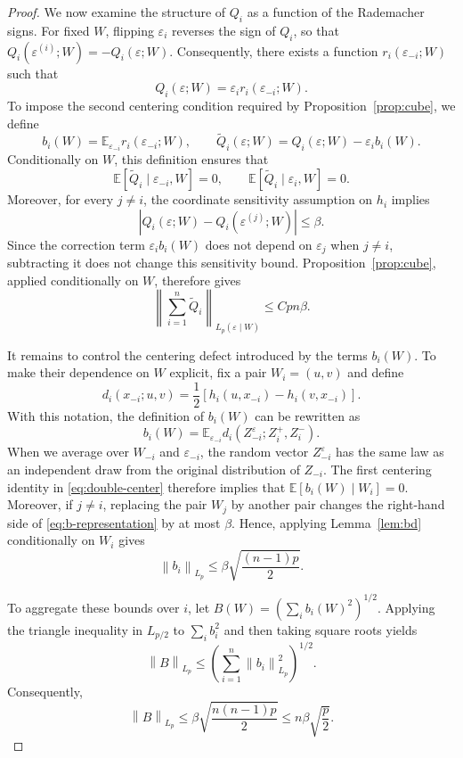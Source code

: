 \documentclass[11pt]{article}
\newcommand{\E}{\mathbb{E}}
\newcommand{\norm}[1]{\left\lVert #1\right\rVert}
\newcommand{\abs}[1]{\left\lvert #1\right\rvert}
\begin{document}
\begin{proof}
We now examine the structure of $Q_i$ as a function of the Rademacher signs. For fixed $W$, flipping $\varepsilon_i$ reverses the sign of $Q_i$, so that $Q_i(\varepsilon^{(i)};W)=-Q_i(\varepsilon;W)$. Consequently, there exists a function $r_i(\varepsilon_{-i};W)$ such that
\[ Q_i(\varepsilon;W) = \varepsilon_i r_i(\varepsilon_{-i};W). \]
To impose the second centering condition required by Proposition~\ref{prop:cube}, we define
\[
b_i(W) = \E_{\varepsilon_{-i}} r_i(\varepsilon_{-i};W), \qquad \widetilde Q_i(\varepsilon;W) = Q_i(\varepsilon;W)-\varepsilon_i b_i(W).
\]
Conditionally on $W$, this definition ensures that
\[ \E[\widetilde Q_i\mid\varepsilon_{-i},W]=0, \qquad \E[\widetilde Q_i\mid\varepsilon_i,W]=0. \]
Moreover, for every $j\neq i$, the coordinate sensitivity assumption on $h_i$ implies
\[ \abs{Q_i(\varepsilon;W)-Q_i(\varepsilon^{(j)};W)} \le\beta.\]
Since the correction term $\varepsilon_i b_i(W)$ does not depend on $\varepsilon_j$ when $j\neq i$, subtracting it does not change this sensitivity bound. Proposition~\ref{prop:cube}, applied conditionally on $W$, therefore gives
\begin{equation}\label{eq:Qtilde}
\norm{\sum_{i=1}^n\widetilde Q_i}_{L_p(\varepsilon\mid W)} \le Cpn\beta.
\end{equation}

It remains to control the centering defect introduced by the terms $b_i(W)$. To make their dependence on $W$ explicit, fix a pair $W_i=(u,v)$ and define
\[
d_i(x_{-i};u,v)
=
\frac12
\left[
h_i(u,x_{-i})-h_i(v,x_{-i})
\right].
\]
With this notation, the definition of $b_i(W)$ can be rewritten as
\begin{equation}\label{eq:b-representation}
b_i(W)
=
\E_{\varepsilon_{-i}}
d_i(Z_{-i}^{\varepsilon};Z_i^+,Z_i^-).
\end{equation}
When we average over $W_{-i}$ and $\varepsilon_{-i}$, the random vector $Z_{-i}^{\varepsilon}$ has the same law as an independent draw from the original distribution of $Z_{-i}$. The first centering identity in \eqref{eq:double-center} therefore implies that $\E[b_i(W)\mid W_i]=0$. Moreover, if $j\neq i$, replacing the pair $W_j$ by another pair changes the right-hand side of \eqref{eq:b-representation} by at most $\beta$. Hence, applying Lemma~\ref{lem:bd} conditionally on $W_i$ gives
\[
\norm{b_i}_{L_p} \le \beta\sqrt{\frac{(n-1)p}{2}}.
\]

To aggregate these bounds over $i$, let \( B(W)=\left(\sum_i b_i(W)^2\right)^{1/2} \). Applying the triangle inequality in $L_{p/2}$ to $\sum_ib_i^2$ and then taking square roots yields
\[
\norm{B}_{L_p} \le \left(\sum_{i=1}^n\norm{b_i}_{L_p}^2\right)^{1/2}.
\]
Consequently,
\begin{equation}\label{eq:B-moment}
\norm{B}_{L_p} \le \beta\sqrt{\frac{n(n-1)p}{2}} \le n\beta\sqrt{\frac p2}.
\end{equation}


\end{proof}
\end{document}
